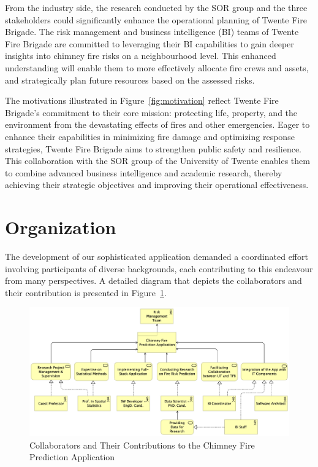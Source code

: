 \documentclass{utitcphd_overleaf}
\begin{document}
From the industry side, the research conducted by the SOR group and the three stakeholders could significantly enhance the operational planning of Twente Fire Brigade. The risk management and business intelligence (BI) teams of Twente Fire Brigade are committed to leveraging their BI capabilities to gain deeper insights into chimney fire risks on a neighbourhood level. This enhanced understanding will enable them to more effectively allocate fire crews and assets, and strategically plan future resources based on the assessed risks.

The motivations illustrated in Figure~\ref{fig:motivation} reflect Twente Fire Brigade's commitment to their core mission: protecting life, property, and the environment from the devastating effects of fires and other emergencies. Eager to enhance their capabilities in minimizing fire damage and optimizing response strategies, Twente Fire Brigade aims to strengthen public safety and resilience. This collaboration with the SOR group of the University of Twente enables them to combine advanced business intelligence and academic research, thereby achieving their strategic objectives and improving their operational effectiveness.

\section{Organization}
\label{sec:organization}

The development of our sophisticated application demanded a coordinated effort involving participants of diverse backgrounds, each contributing to this endeavour from many perspectives. A detailed diagram that depicts the collaborators and their contribution is presented in Figure~\ref{fig:organization}.

\begin{figure}[ht]
  \centering
  \includegraphics[width=1\textwidth]{my_images/other/organization.pdf}
  \caption{Collaborators and Their Contributions to the Chimney Fire Prediction Application}
  \label{fig:organization}
\end{figure}
\end{document}
